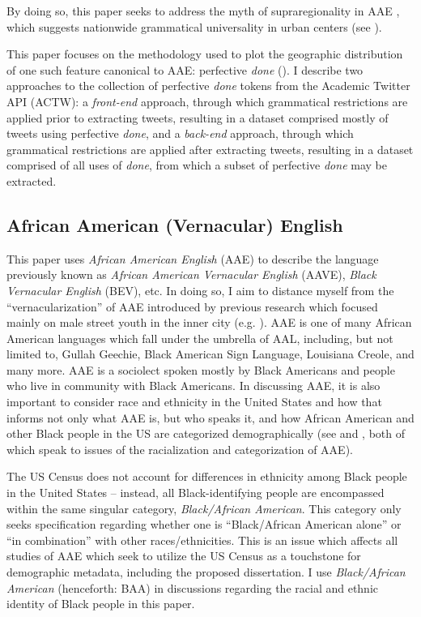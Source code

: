 \documentclass[output=paper,draftmode,colorlinks,citecolor=brown]{langscibook}
\begin{document}
By doing so, this paper seeks to address the myth of supraregionality in AAE \citep{Wolfram2007}, which suggests nationwide grammatical universality in urban centers (see ).

This paper focuses on the methodology used to plot the geographic distribution of one such feature canonical to AAE: perfective \textit{done} (\cite{Rickford1999, Green2002, Green2010}). I describe two approaches to the collection of perfective \textit{done} tokens from the Academic Twitter API (ACTW): a \textit{front-end} approach, through which grammatical restrictions are applied prior to extracting tweets, resulting in a dataset comprised mostly of tweets using perfective \textit{done}, and a \textit{back-end} approach, through which grammatical restrictions are applied after extracting tweets, resulting in a dataset comprised of all uses of \textit{done}, from which a subset of perfective \textit{done} may be extracted.

\subsection{African American (Vernacular) English} %
\label{sec:baxter:1.2}
This paper uses \textit{African American English} (AAE) to describe the language previously known as \textit{African American Vernacular English} (AAVE), \textit{Black Vernacular English} (BEV), etc. In doing so, I aim to distance myself from the “vernacularization” of AAE introduced by previous research which focused mainly on male street youth in the inner city (e.g. \cite{Labov1972}). AAE is one of many African American languages which fall under the umbrella of AAL, including, but not limited to, Gullah Geechie, Black American Sign Language, Louisiana Creole, and many more. AAE is a sociolect spoken mostly by Black Americans and people who live in community with Black Americans. In discussing AAE, it is also important to consider race and ethnicity in the United States and how that informs not only what AAE is, but who speaks it, and how African American and other Black people in the US are categorized demographically (see \citet{Blake2014} and \citet{King2020}, both of which speak to issues of the racialization and categorization of AAE).

The US Census does not account for differences in ethnicity among Black people in the United States -- instead, all Black-identifying people are encompassed within the same singular category, \textit{Black/African American}. This category only seeks specification regarding whether one is “Black/African American alone” or “in combination” with other races/ethnicities. This is an issue which affects all studies of AAE which seek to utilize the US Census as a touchstone for demographic metadata, including the proposed dissertation. I use \textit{Black/African American} (henceforth: BAA) in discussions regarding the racial and ethnic identity of Black people in this paper.
\end{document}
